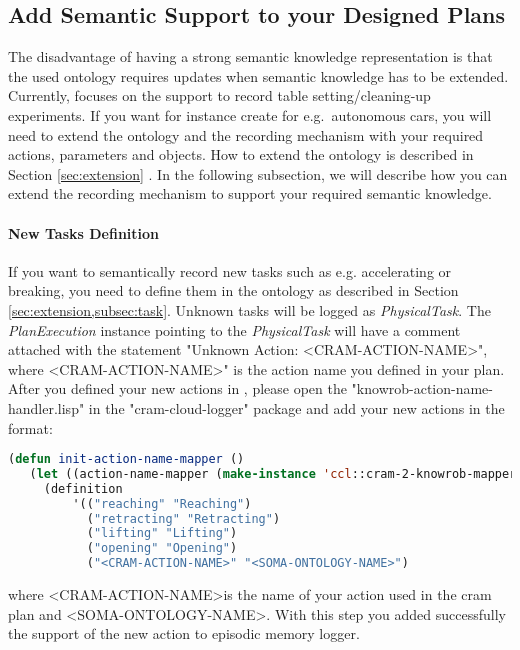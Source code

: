 \subsection{Add Semantic Support to your Designed Plans}
The disadvantage of having a strong semantic knowledge representation is that the used ontology requires updates when semantic knowledge has to be extended. 
Currently, \soma focuses on the support to record table setting/cleaning-up experiments.
If you want for instance create \neems for e.g.\ autonomous cars, you will need to extend the \soma ontology and the recording mechanism with your required actions, parameters and objects.
How to extend the \soma ontology is described in Section \ref{sec:extension} .
In the following subsection, we will describe how you can extend the \cram recording mechanism to support your required semantic knowledge.

\paragraph{New Tasks Definition}
If you want to semantically record new tasks such as e.g. accelerating or breaking, you need to define them in the ontology as described in Section \ref{sec:extension,subsec:task}.
Unknown tasks  will be logged as \textit{PhysicalTask}.
The \textit{PlanExecution} instance pointing to the \textit{PhysicalTask} will have a comment attached with the statement "Unknown Action: \textless CRAM-ACTION-NAME\textgreater", where \textless CRAM-ACTION-NAME\textgreater" is the action name you defined in your plan.
After you defined your new actions in \soma, please open the "knowrob-action-name-handler.lisp" in the "cram-cloud-logger" package and add your new actions in the format:

\begin{lstlisting}[language=lisp, caption=Linking the CRAM Action to the Ontology Concept]
(defun init-action-name-mapper ()
   (let ((action-name-mapper (make-instance 'ccl::cram-2-knowrob-mapper))
     (definition
         '(("reaching" "Reaching")
           ("retracting" "Retracting")
           ("lifting" "Lifting")
           ("opening" "Opening")
           ("<CRAM-ACTION-NAME>" "<SOMA-ONTOLOGY-NAME>")
\end{lstlisting}

where \textless CRAM-ACTION-NAME\textgreater is the name of your action used in the cram plan and \textless SOMA-ONTOLOGY-NAME\textgreater {}. 
With this step you added successfully the support of the new action to \cram \neem episodic memory logger.

